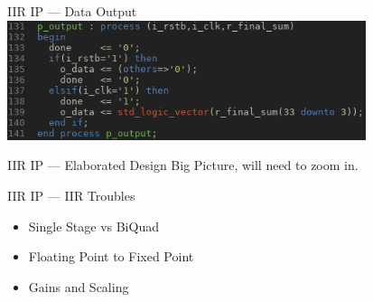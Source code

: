 \documentclass{beamer}
\begin{document}
\begin{frame}{IIR IP --- Data Output}
  \includegraphics[height=3.5cm]
                  {output.png}
\end{frame}
\begin{frame}{IIR IP --- Elaborated Design }
  Big Picture, will need to zoom in.
\end{frame}
\begin{frame}{IIR IP --- IIR Troubles }
  \begin{itemize}[<+>]
  \item Single Stage vs BiQuad
  \item Floating Point to Fixed Point
  \item Gains and Scaling
  \end{itemize}
\end{frame}
\end{document}
